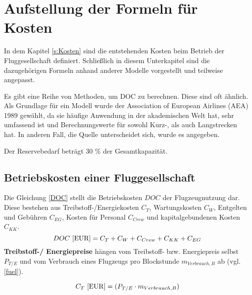 \section{Aufstellung der Formeln für Kosten}
\label{s:Aufstellung der Formeln für Kosten}

In dem Kapitel \ref{s:Kosten} sind die entstehenden Kosten beim Betrieb der Fluggesellschaft definiert.
Schließlich in diesem Unterkapitel sind die dazugehörigen Formeln anhand anderer Modelle vorgestellt und teilweise angepasst. 

Es gibt eine Reihe von Methoden, um DOC zu berechnen. Diese sind oft ähnlich.
Als Grundlage für ein Modell wurde der Association of European Airlines (AEA) 1989 gewählt, 
da sie häufige Anwendung in der akademischen Welt hat,
sehr umfassend ist und Berechnungswerte für sowohl Kurz-, als auch Langstrecken hat. In anderen Fall, die Quelle unterscheidet sich,
wurde es angegeben.

Der Reservebedarf beträgt 30 \% der Gesamtkapazität.

\subsection{Betriebskosten einer Fluggesellschaft}

Die Gleichung \eqref{DOC} stellt die Betriebskosten $DOC$ der Flugzeugnutzung dar. Diese bestehen aus Treibstoff-/Energiekosten $C_T$, 
Wartungskosten $C_W$, Entgelten und Gebühren $C_{EG}$, Kosten für Personal $C_{Crew}$ und kapitalgebundenen Kosten $C_{KK}$.
%
\begin{equation}
     {DOC ~[\text{EUR}]} = C_T + C_W + C_{Crew} + C_{KK} + C_{EG} \\
     \label{DOC}
  \end{equation}
%
\textbf{Treibstoff-/ Energiepreise} hängen vom Treibstoff- bzw. Energiepreis selbst \\ $P_{T/E}$ und vom Verbrauch 
eines Flugzeugs pro Blockstunde $m_{Verbrauch,B}$ ab (vgl. \eqref{fuel}).

\begin{equation}
   {C_T ~[\text{EUR}]} = (P_{T/E} \cdot m_{Verbrauch,B}) \\
   \label{fuel}
\end{equation}

